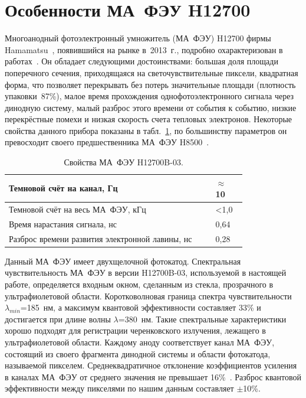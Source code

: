 \section{Особенности МА~ФЭУ H12700}\label{section:secMapmt}

Многоанодный фотоэлектронный умножитель (МА~ФЭУ) H12700 фирмы Hamamatsu~\cite{H12700MANUAL}, появившийся на рынке в~2013~г., подробно охарактеризован в работах~\cite{CALVI, CALVI2}. Он обладает следующими достоинствами: большая доля площади поперечного сечения, приходящаяся на светочувствительные пиксели, квадратная форма, что позволяет перекрывать без потерь значительные площади (плотность упаковки~87\%), малое время прохождения однофотоэлектронного сигнала через динодную систему, малый разброс этого времени от события к событию, низкие перекрёстные помехи и низкая скорость счета тепловых электронов. Некоторые свойства данного прибора показаны в табл.~\ref{tabl:MAPMT}, по большинству параметров он превосходит своего предшественника МА~ФЭУ H8500~\cite{H8500MANUAL}.

\begin{table}[H]
\caption{Свойства МА~ФЭУ H12700B-03.}
\label{tabl:MAPMT}


\begin{tabular}{ | p{0.7\linewidth} | p{0.1\linewidth} |}
	\hline
	Темновой счёт на канал, Гц & $ \approx $ 10 \\
	\hline
	Темновой счёт на весь МА~ФЭУ, кГц & <1,0 \\
	\hline
	Время нарастания сигнала, нс & 0,64 \\
	\hline
	Разброс времени развития электронной лавины, нс & 0,28 \\
	\hline
\end{tabular}

\end{table}

Данный МА~ФЭУ имеет двухщелочной фотокатод. Спектральная чувствительность МА~ФЭУ в версии H12700B-03, используемой в настоящей работе, определяется входным окном, сделанным из стекла, прозрачного в ультрафиолетовой области. Коротковолновая граница спектра чувствительности $ \lambda_{min} $=185~нм, а максимум квантовой эффективности составляет 33\% и достигается при длине волны $ \lambda $=380~нм. Такие спектральные характеристики хорошо подходят для регистрации черенковского излучения, лежащего в ультрафиолетовой области. Каждому аноду соответствует канал МА~ФЭУ, состоящий из своего фрагмента динодной системы и области фотокатода, называемой пикселем. Среднеквадратичное отклонение коэффициентов усиления в каналах МА~ФЭУ от среднего значения не превышает 16\%~\cite{H12700MANUAL}. Разброс квантовой эффективности между пикселями по нашим данным составляет $ \pm $10\%.

